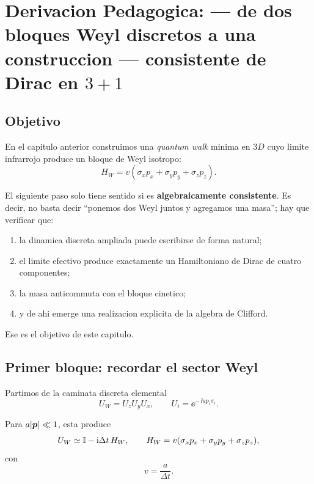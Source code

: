 \chapter{Derivacion Pedagogica: --- de dos bloques Weyl discretos a una construccion --- consistente de Dirac en \(3+1\)}
\label{ch:qw-3d-weyl-a-dirac-3p1}







\section{Objetivo}
En el capitulo anterior construimos una \textit{quantum walk} minima en \(3D\) cuyo limite infrarrojo produce un bloque de Weyl isotropo:
\begin{equation}
H_W = v(\sigma_x p_x+\sigma_y p_y+\sigma_z p_z).
\end{equation}

El siguiente paso solo tiene sentido si es \textbf{algebraicamente consistente}. Es decir, no basta decir \enquote{ponemos dos Weyl juntos y agregamos una masa}; hay que verificar que:
\begin{enumerate}[label=\arabic*.]
    \item la dinamica discreta ampliada puede escribirse de forma natural;
    \item el limite efectivo produce exactamente un Hamiltoniano de Dirac de cuatro componentes;
    \item la masa anticommuta con el bloque cinetico;
    \item y de ahi emerge una realizacion explicita de la algebra de Clifford.
\end{enumerate}

Ese es el objetivo de este capitulo.

\section{Primer bloque: recordar el sector Weyl}
Partimos de la caminata discreta elemental
\begin{equation}
U_W = U_z U_y U_x,
\qquad
U_i = \ee^{-\,\ii a p_i \sigma_i}.
\label{c08:eq:UW}
\end{equation}

Para \(a|\bm{p}|\ll 1\), esta produce
\begin{equation}
U_W \simeq \mathbb{I} - \mathrm{i} \Delta t\,H_W,
\qquad
H_W = v(\sigma_x p_x+\sigma_y p_y+\sigma_z p_z),
\label{c08:eq:HW}
\end{equation}
con
\begin{equation}
v=\frac{a}{\Delta t}.
\end{equation}

